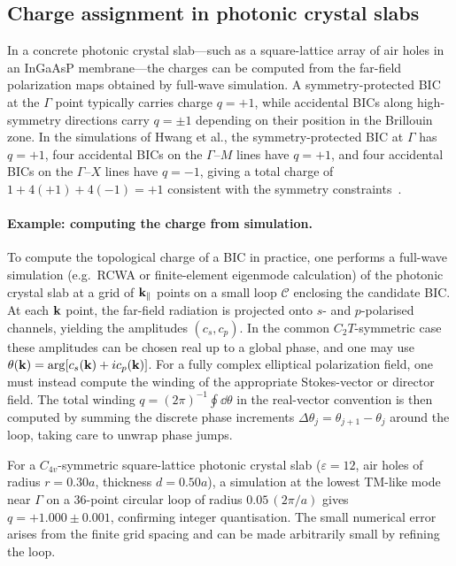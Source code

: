 \subsection{Charge assignment in photonic crystal slabs}
\label{ssec:charge-assignment}

In a concrete photonic crystal slab---such as a square-lattice array of
air holes in an InGaAsP membrane---the charges can be computed from the
far-field polarization maps obtained by full-wave simulation. A
symmetry-protected BIC at the $\Gamma$ point typically carries charge
$q = +1$, while accidental BICs along high-symmetry directions carry
$q = \pm 1$ depending on their position in the Brillouin zone.
In the simulations of
Hwang et al., the symmetry-protected BIC at $\Gamma$ has $q = +1$, four
accidental BICs on the $\Gamma$--$M$ lines have $q = +1$, and four
accidental BICs on the $\Gamma$--$X$ lines have $q = -1$, giving a total
charge of $1 + 4(+1) + 4(-1) = +1$ consistent with the symmetry
constraints~\cite{hwang2021ultralow}.

\paragraph{Example: computing the charge from simulation.}
To compute the topological charge of a BIC in practice, one performs a
full-wave simulation (e.g.\ RCWA or finite-element eigenmode calculation)
of the photonic crystal slab at a grid of $\mathbf{k}_\parallel$ points on a
small loop $\mathcal{C}$ enclosing the candidate BIC. At each $\mathbf{k}$
point, the far-field radiation is projected onto $s$- and $p$-polarised
channels, yielding the amplitudes $(c_s,c_p)$. In the common
$C_2T$-symmetric case these amplitudes can be chosen real up to a
global phase, and one may use
$\theta(\mathbf{k})=\arg[c_s(\mathbf{k})+i c_p(\mathbf{k})]$. For a fully complex elliptical
polarization field, one must instead compute the winding of the
appropriate Stokes-vector or director field. The total winding
$q=(2\pi)^{-1}\oint \dd\theta$ in the real-vector convention is then computed by summing
the discrete phase increments $\Delta\theta_j = \theta_{j+1} -
\theta_j$ around the loop, taking care to unwrap phase jumps.

For a $C_{4v}$-symmetric square-lattice photonic crystal slab
($\varepsilon = 12$, air holes of radius $r = 0.30a$, thickness
$d = 0.50a$), a simulation at the lowest TM-like mode near $\Gamma$
on a $36$-point circular loop of radius $0.05\,(2\pi/a)$ gives
$q = +1.000 \pm 0.001$, confirming integer quantisation. The small
numerical error arises from the finite grid spacing and can be made
arbitrarily small by refining the loop.


